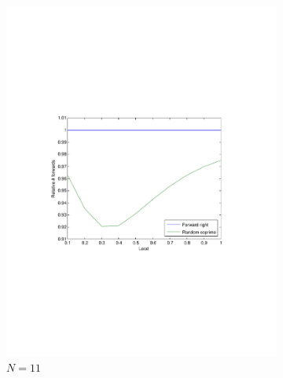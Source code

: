 \documentclass[10pt,a4paper]{article}
\begin{document}
\begin{figure}
		\begin{subfigure}[b]{0.49\textwidth}
			\centering
			\includegraphics[clip=true, trim=9em 24em 9em 24em, width=\textwidth]{resources/plotrandcoprime11.pdf}
			\caption{$N=11$}
			\label{validcp11}
		\end{subfigure}
		\begin{subfigure}[b]{0.49\textwidth}
			\centering

\end{subfigure}
\end{figure}
\end{document}
